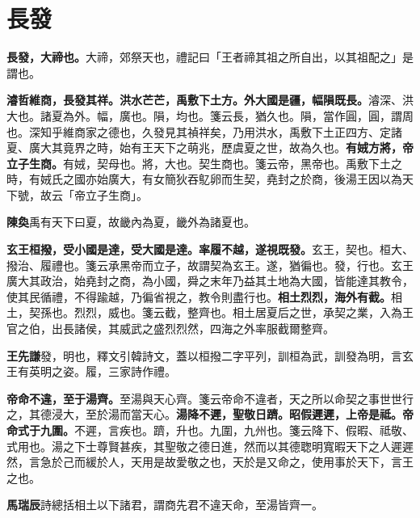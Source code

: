 \section{長發}


\textbf{長發，大禘也。}{\footnotesize 大禘，郊祭天也，禮記曰「王者禘其祖之所自出，以其祖配之」是謂也。}

\textbf{濬哲維商，長發其祥。洪水芒芒，禹敷下土方。外大國是疆，幅隕既長。}{\footnotesize 濬深、洪大也。諸夏為外。幅，廣也。隕，均也。箋云長，猶久也。隕，當作圓，圓，謂周也。深知乎維商家之德也，久發見其禎祥矣，乃用洪水，禹敷下土正四方、定諸夏、廣大其竟界之時，始有王天下之萌兆，歷虞夏之世，故為久也。}\textbf{有娀方將，帝立子生商。}{\footnotesize 有娀，契母也。將，大也。契生商也。箋云帝，黑帝也。禹敷下土之時，有娀氏之國亦始廣大，有女簡狄吞鳦卵而生契，堯封之於商，後湯王因以為天下號，故云「帝立子生商」。}

\begin{quoting}\textbf{陳奐}禹有天下曰夏，故畿內為夏，畿外為諸夏也。\end{quoting}

\textbf{玄王桓撥，受小國是達，受大國是達。率履不越，遂視既發。}{\footnotesize 玄王，契也。桓大、撥治、履禮也。箋云承黑帝而立子，故謂契為玄王。遂，猶徧也。發，行也。玄王廣大其政治，始堯封之商，為小國，舜之末年乃益其土地為大國，皆能達其教令，使其民循禮，不得踰越，乃徧省視之，教令則盡行也。}\textbf{相土烈烈，海外有截。}{\footnotesize 相土，契孫也。烈烈，威也。箋云截，整齊也。相土居夏后之世，承契之業，入為王官之伯，出長諸侯，其威武之盛烈烈然，四海之外率服截爾整齊。}

\begin{quoting}\textbf{王先謙}發，明也，釋文引韓詩文，蓋以桓撥二字平列，訓桓為武，訓發為明，言玄王有英明之姿。履，三家詩作禮。\end{quoting}

\textbf{帝命不違，至于湯齊。}{\footnotesize 至湯與天心齊。箋云帝命不違者，天之所以命契之事世世行之，其德浸大，至於湯而當天心。}\textbf{湯降不遲，聖敬日躋。昭假遲遲，上帝是祗。帝命式于九圍。}{\footnotesize 不遲，言疾也。躋，升也。九圍，九州也。箋云降下、假暇、祗敬、式用也。湯之下士尊賢甚疾，其聖敬之德日進，然而以其德聦明寬暇天下之人遲遲然，言急於己而緩於人，天用是故愛敬之也，天於是又命之，使用事於天下，言王之也。}

\begin{quoting}\textbf{馬瑞辰}詩總括相土以下諸君，謂商先君不違天命，至湯皆齊一。\end{quoting}

